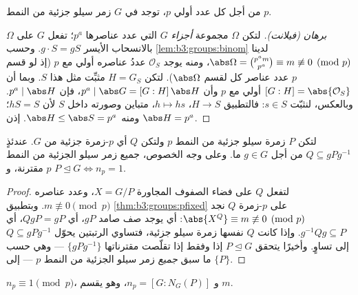 \begin{theorem}\label{thm:b3:groups:sylow1}
من أجل كل عدد أولي $p$، توجد في $G$ زمر سيلو جزئية من النمط $p$.
\end{theorem}

\begin{proof}[برهان (فيلانت)]
لتكن $\Omega$ مجموعة \emph{أجزاء} $G$ التي عدد عناصرها $p^a$؛ تفعل
$G$ على $\Omega$ بالانسحاب الأيسر $g \cdot S = gS$. وحسب
\cref{lem:b3:groups:binom} لدينا $\abs\Omega = \binom{p^a m}{p^a}
\equiv m \not\equiv 0 \pmod p$، ومنه يوجد  $\mathcal O_S$
عددُ عناصره أولي مع $p$ (إذ لو قسم $p$ عدد عناصر كل  لقسم
$\abs\Omega$). لتكن $H = G_S$ مثبِّت مثل هذا $S$. وبما أن $[G : H] = \abs{\mathcal O_S}$
أولي مع $p$ وأن $p^a \mid
\abs G = [G:H]\,\abs H$، فإن $p^a \mid \abs H$. وبالعكس، لنثبّت
$s \in S$: فالتطبيق $H \to S$، $h \mapsto hs$، متباين وصورته داخل
$S$ لأن $hS = S$؛ ومنه $\abs H \leq \abs S = p^a$. إذن $\abs H = p^a$.
\end{proof}

\begin{theorem}\label{thm:b3:groups:sylow2}
لتكن $P$ زمرة سيلو جزئية من النمط $p$ ولتكن $Q$ أي $p$-زمرة جزئية
من $G$. عندئذٍ $Q \subseteq gPg^{-1}$ من أجل $g \in G$ ما. وعلى وجه الخصوص،
جميع زمر سيلو الجزئية من النمط $p$ مقترنة، و $P \trianglelefteq G \iff
n_p = 1$.
\end{theorem}

\begin{proof}
لتفعل $Q$ على فضاء الصفوف المجاورة $X = G/P$، وعدد عناصره $m
\not\equiv 0 \pmod p$.
وبتطبيق \cref{thm:b3:groups:pfixed} على $p$-زمرة $Q$ نجد
$\abs{X^Q} \equiv m \not\equiv 0 \pmod p$: أي يوجد صف صامد $gP$، أي $QgP = gP$، أي $g^{-1}Qg \subseteq
P$.
وإذا كانت $Q$ نفسها زمرة سيلو جزئية، فتساوي الرتبتين يحوّل
$Q \subseteq gPg^{-1}$ إلى تساوٍ. وأخيرًا يتحقق $P
\trianglelefteq G$ إذا وفقط إذا
تقلّصت مقترناتها $\{gPg^{-1}\}$ --- وهي حسب ما سبق \emph{جميع} زمر
سيلو الجزئية من النمط $p$ --- إلى $\{P\}$.
\end{proof}

\begin{theorem}\label{thm:b3:groups:sylow3}
$n_p \equiv 1 \pmod p$، و $n_p = [G : N_G(P)]$، وهو يقسم $m$.
\end{theorem}

